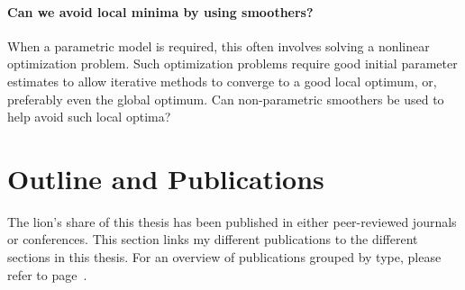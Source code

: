 \paragraph{Can we avoid local minima by using smoothers?}
When a parametric model is required, this often involves solving a nonlinear optimization problem.
Such optimization problems require good initial parameter estimates to allow iterative methods to converge to a good local optimum, or, preferably even the global optimum.
Can non-parametric smoothers be used to help avoid such local optima?


\section{Outline and Publications}
   The lion's share of this thesis has been published in either peer-reviewed  journals or conferences.
   This section links my different publications to the different sections in this thesis.
   For an overview of publications grouped by type, please refer to page~\pageref{publicationList}.

